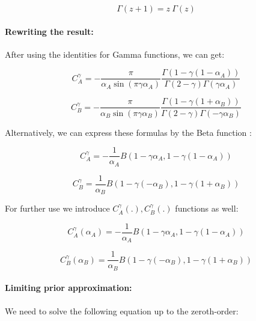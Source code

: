 \documentclass{article}
\theoremstyle{definition}
\begin{document}
\begin{equation}
    \Gamma(z+1) = z \ \Gamma(z)
\end{equation}

\paragraph{Rewriting the result:} After using the identities for Gamma functions, we can get:

\begin{equation}
    C^\gamma_A = - \frac{\pi}{\alpha_A \sin(\pi \gamma \alpha_A)}
    \frac{\Gamma(1-\gamma(1-\alpha_A))}
    {\Gamma(2-\gamma) \Gamma(\gamma \alpha_A)}
\end{equation}

\begin{equation}
    C^\gamma_B = - \frac{\pi}{\alpha_B \sin(\pi \gamma \alpha_B)}
    \frac{\Gamma(1-\gamma(1+\alpha_B))}
    {\Gamma(2-\gamma) \Gamma(-\gamma \alpha_B)}
\end{equation}

Alternatively, we can express these formulas by the Beta function \cite{book:HigherTranscendentalFunctions, book:SeymourMathematicalHandbook, book:Bronshtein, book:NISThandbook, book:Abramowitz}:

\begin{equation}
    C^\gamma_A = - \frac{1}{\alpha_A}
    B(1-\gamma \alpha_A, 1- \gamma (1-\alpha_A))
\end{equation}

\begin{equation}
    C^\gamma_B = \frac{1}{\alpha_B}
    B(1-\gamma (-\alpha_B), 1- \gamma (1+\alpha_B))
\end{equation}

For further use we introduce $C^\gamma_A(.),C^\gamma_B(.)$ functions as well:

\begin{equation}
    \label{eq:CAgamma_f}
    C^\gamma_A(\alpha_A) = - \frac{1}{\alpha_A}
    B(1-\gamma \alpha_A, 1- \gamma (1-\alpha_A))
\end{equation}

\begin{equation}
    \label{eq:CBgamma_f}
    C^\gamma_B(\alpha_B) = \frac{1}{\alpha_B}
    B(1-\gamma (-\alpha_B), 1- \gamma (1+\alpha_B))
\end{equation}


\paragraph{Limiting prior approximation:}
We need to solve the following equation up to the zeroth-order:
\end{document}
